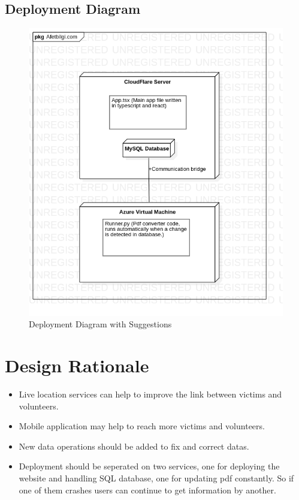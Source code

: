 \subsection{Deployment Diagram}
\begin{figure}[H]
    \includegraphics[scale = 0.5]{assets/DeploymentDiagram2.png}
    \caption[Deployment Diagram with Suggestions]{Deployment Diagram with Suggestions}
\end{figure}

\section{Design Rationale}
\begin{itemize}
    \item Live location services can help to improve the link between victims and volunteers.
    \item Mobile application may help to reach more victims and volunteers.
    \item New data operations should be added to fix and correct datas.
    \item Deployment should be seperated on two services, one for deploying the website and handling SQL database, one for updating pdf constantly. So if one of them crashes users can continue to get information by another.
\end{itemize}